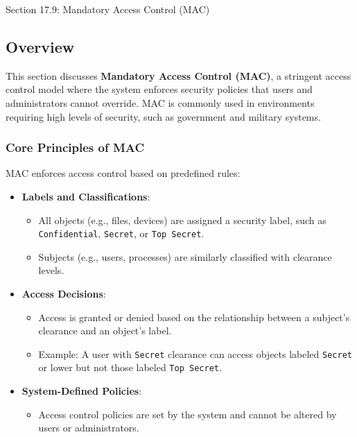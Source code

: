 \begin{notes}{Section 17.9: Mandatory Access Control (MAC)}
    \subsection*{Overview}

    This section discusses \textbf{Mandatory Access Control (MAC)}, a stringent access control model where the system enforces security policies that users and administrators cannot override. MAC is 
    commonly used in environments requiring high levels of security, such as government and military systems.
    
    \subsubsection*{Core Principles of MAC}
    
    MAC enforces access control based on predefined rules:
    \begin{itemize}
        \item \textbf{Labels and Classifications}:
        \begin{itemize}
            \item All objects (e.g., files, devices) are assigned a security label, such as \texttt{Confidential}, \texttt{Secret}, or \texttt{Top Secret}.
            \item Subjects (e.g., users, processes) are similarly classified with clearance levels.
        \end{itemize}
        \item \textbf{Access Decisions}:
        \begin{itemize}
            \item Access is granted or denied based on the relationship between a subject's clearance and an object's label.
            \item Example: A user with \texttt{Secret} clearance can access objects labeled \texttt{Secret} or lower but not those labeled \texttt{Top Secret}.
        \end{itemize}
        \item \textbf{System-Defined Policies}:
        \begin{itemize}
            \item Access control policies are set by the system and cannot be altered by users or administrators.
        \end{itemize}
    \end{itemize}
    

\end{notes}
